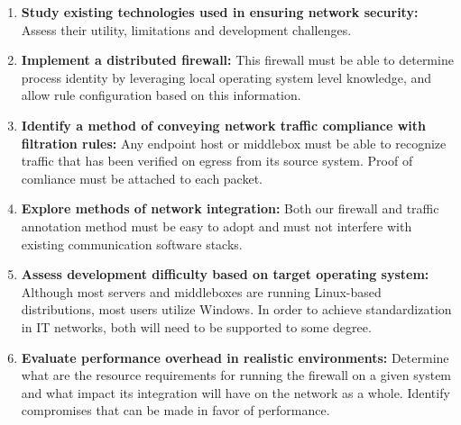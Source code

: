 \begin{enumerate}
    \item \textbf{Study existing technologies used in ensuring network security:}
          Assess their utility, limitations and development challenges.
    \item \textbf{Implement a distributed firewall:} This firewall must be able
          to determine process identity by leveraging local operating system
          level knowledge, and allow rule configuration based on this information.
    \item \textbf{Identify a method of conveying network traffic compliance with
          filtration rules:} Any endpoint host or middlebox must be able to
          recognize traffic that has been verified on egress from its source
          system. Proof of comliance must be attached to each packet.
    \item \textbf{Explore methods of network integration:} Both our firewall and
          traffic annotation method must be easy to adopt and must not interfere
          with existing communication software stacks.
    \item \textbf{Assess development difficulty based on target operating system:}
          Although most servers and middleboxes are running Linux-based
          distributions, most users utilize Windows. In order to achieve
          standardization in IT networks, both will need to be supported to
          some degree.
   \item \textbf{Evaluate performance overhead in realistic environments:}
          Determine what are the resource requirements for running the firewall
          on a given system and what impact its integration will have on the
          network as a whole. Identify compromises that can be made in favor of
          performance.
\end{enumerate}

